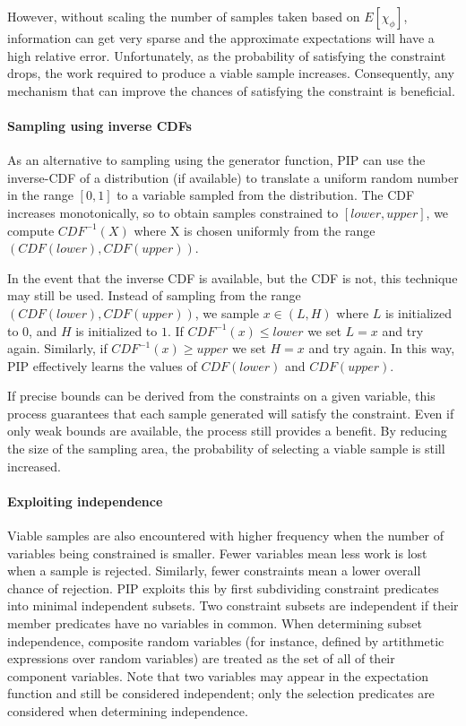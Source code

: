 However, without scaling the number of samples taken based on $E[\chi_\phi]$, information can get very sparse and the approximate expectations will have a high relative error.  Unfortunately, as the probability of satisfying the constraint drops, the work required to produce a viable sample increases.   Consequently, any mechanism that can improve the chances of satisfying the constraint is beneficial.

\paragraph{Sampling using inverse CDFs}
\label{subsec:icdf}
As an alternative to sampling using the generator function, PIP can use the inverse-CDF of a distribution (if available) to translate a uniform random number in the range $[0,1]$ to a variable sampled from the distribution.  The CDF increases monotonically, so to obtain samples constrained to $[lower, upper]$, we compute $CDF^{-1}(X)$ where X is chosen uniformly  from the range $(CDF(lower), CDF(upper))$.   

In the event that the inverse CDF is available, but the CDF is not, this technique may still be used.  Instead of sampling from the range $(CDF(lower), CDF(upper))$, we sample $x \in (L,H)$ where $L$ is initialized to $0$, and $H$ is initialized to $1$.  If $CDF^{-1}(x) \leq lower$ we set $L = x$ and try again.  Similarly, if $CDF^{-1}(x)  \geq upper$ we set $H = x$ and try again.   In this way, PIP effectively learns the values of $CDF(lower)$ and $CDF(upper)$.  

If precise bounds can be derived from the constraints on a given variable, this process guarantees that each sample generated will satisfy the constraint.  Even if only weak bounds are available, the process still provides a benefit.  By reducing the size of the sampling area, the probability of selecting a viable sample is still increased.  

\paragraph{Exploiting independence}
\label{subsec:independence}
Viable samples are also encountered with higher frequency when the number of variables being constrained is smaller.  Fewer variables mean less work is lost when a sample is rejected.  Similarly, fewer constraints mean a lower overall chance of rejection.  PIP exploits this by first subdividing constraint predicates into minimal independent subsets.  Two constraint subsets are independent if their member predicates have no variables in common.  When determining subset independence, composite random variables (for instance, defined by artithmetic expressions over random variables) are treated as the set of all of their component variables.  Note that two variables may appear in the expectation function and still be considered independent; only the selection predicates are considered when determining independence.

